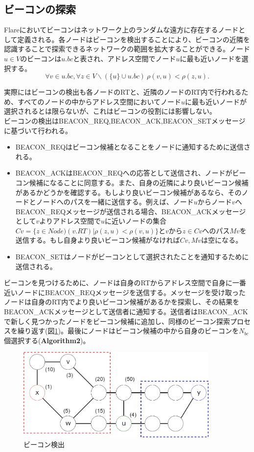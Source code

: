\documentclass[12pt]{jarticle}
\begin{document}
\subsection{ビーコンの探索}
Flareにおいてビーコンはネットワーク上のランダムな遠方に存在するノードとして定義される。各ノードはビーコンを検出することにより、ビーコンの近隣を認識することで探索できるネットワークの範囲を拡大することができる。ノード$u \in V$のビーコンは$u.bc$と表され、アドレス空間でノード$u$に最も近いノードを選択する。
\begin{equation*}
\forall v \in u.bc, \forall z \in V \backslash (\{u \} \cup u.bc) \ \rho(v,u) < \rho(z,u).
\end{equation*}

実際にはビーコンの検出も各ノードのRTと、近隣のノードのRT内で行われるため、すべてのノードの中からアドレス空間においてノード$u$に最も近いノードが選択されるとは限らないが、これはビーコンの役割には影響しない。
\\
ビーコンの検出はBEACON\_REQ,BEACON\_ACK,BEACON\_SETメッセージに基づいて行われる。
\begin{itemize}
\item BEACON\_REQはビーコン候補となることをノードに通知するために送信される。
\item BEACON\_ACKはBEACON\_REQへの応答として送信され、ノードがビーコン候補になることに同意する。また、自身の近隣により良いビーコン候補があるかどうかを確認する。もしより良いビーコン候補があるなら、そのノードとノードへのパスを一緒に送信する。例えば、ノード$u$からノード$v$へBEACON\_REQメッセージが送信される場合、BEACON\_ACKメッセージとして$v$よりアドレス空間で$u$に近いノードの集合$Cv=\{z \in Node)(v.RT)| \rho(z,u) < \rho(v,u)\}$と$v$から$z\in Cv$へのパス$Mv$を送信する。もし自身より良いビーコン候補がなければ$Cv,Mv$は空になる。
\item BEACON\_SETはノードがビーコンとして選択されたことを通知するために送信される。
\end{itemize}

ビーコンを見つけるために、ノードは自身のRTからアドレス空間で自身に一番近いノードにBEACON\_REQメッセージを送信する。メッセージを受け取ったノードは自身のRT内でより良いビーコン候補があるかを探索し、その結果をBEACON\_ACKメッセージとして送信者に通知する。送信者はBEACON\_ACKで新しく見つかったノードをビーコン候補に追加し、同様のビーコン探索プロセスを繰り返す(図\ref{rtbc})。最後にノードはビーコン候補の中から自身のビーコンを$N_{bc}$個選択する(\textbf{Algorithm2})。

\begin{figure}[h]
 \centering
   \includegraphics[width=100mm]{figures/RTBC.jpg}
 \caption{ビーコン検出}
 \label{rtbc}
\end{figure}
\end{document}
